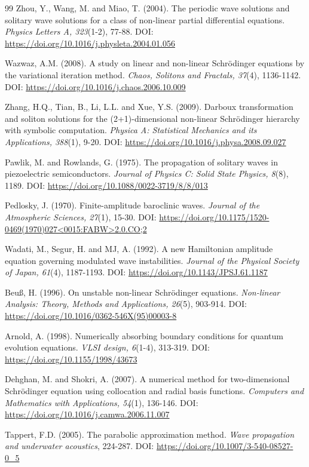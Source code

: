 \documentclass[10pt]{NSP1}
\numberwithin{equation}{section}
\begin{document}
\begin{thebibliography}{99}
 Zhou, Y., Wang, M. and Miao, T. (2004). The periodic wave solutions and solitary wave solutions for a class of non-linear partial differential equations. \emph{Physics Letters A, 323}(1-2), 77-88. DOI: \url{https://doi.org/10.1016/j.physleta.2004.01.056}

 Wazwaz, A.M. (2008). A study on linear and non-linear Schr\"odinger equations by the variational iteration method.\emph{ Chaos, Solitons and Fractals, 37}(4), 1136-1142. DOI: \url{https://doi.org/10.1016/j.chaos.2006.10.009}

 Zhang, H.Q., Tian, B., Li, L.L. and Xue, Y.S. (2009). Darboux transformation and soliton solutions for the (2+1)-dimensional non-linear Schr\"odinger hierarchy with symbolic computation. \emph{Physica A: Statistical Mechanics and its Applications, 388}(1), 9-20. DOI: \url{https://doi.org/10.1016/j.physa.2008.09.027}

 Pawlik, M. and Rowlands, G. (1975). The propagation of solitary waves in piezoelectric semiconductors. \emph{Journal of Physics C: Solid State Physics, 8}(8), 1189. DOI: \url{https://doi.org/10.1088/0022-3719/8/8/013}

 Pedlosky, J. (1970). Finite-amplitude baroclinic waves. \emph{Journal of the Atmospheric Sciences, 27}(1), 15-30. DOI: \url{https://doi.org/10.1175/1520-0469(1970)027<0015:FABW>2.0.CO;2}

 Wadati, M., Segur, H. and MJ, A. (1992). A new Hamiltonian amplitude equation governing modulated wave instabilities. \emph{Journal of the Physical Society of Japan, 61}(4), 1187-1193. DOI: \url{https://doi.org/10.1143/JPSJ.61.1187}

 Beu\ss, H. (1996). On unstable non-linear Schr\"odinger equations. \emph{Non-linear Analysis: Theory, Methods and Applications, 26}(5), 903-914. DOI: \url{https://doi.org/10.1016/0362-546X(95)00003-8}

 Arnold, A. (1998). Numerically absorbing boundary conditions for quantum evolution equations. \emph{VLSI design, 6}(1-4), 313-319. DOI: \url{https://doi.org/10.1155/1998/43673}

 Dehghan, M. and Shokri, A. (2007). A numerical method for two-dimensional Schr\"odinger equation using collocation and radial basis functions. \emph{Computers and Mathematics with Applications, 54}(1), 136-146. DOI: \url{https://doi.org/10.1016/j.camwa.2006.11.007}

 Tappert, F.D. (2005). The parabolic approximation method. \emph{Wave propagation and underwater acoustics}, 224-287. DOI: \url{https://doi.org/10.1007/3-540-08527-0_5}


\end{thebibliography}
\end{document}
